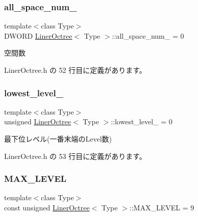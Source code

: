\subsubsection{\texorpdfstring{all\+\_\+space\+\_\+num\+\_\+}{all\_space\_num\_}}
{\footnotesize\ttfamily template$<$class Type$>$ \\
D\+W\+O\+RD \mbox{\hyperlink{class_liner_octree}{Liner\+Octree}}$<$ Type $>$\+::all\+\_\+space\+\_\+num\+\_\+ = 0\hspace{0.3cm}{\ttfamily [private]}}



空間数 



 Liner\+Octree.\+h の 52 行目に定義があります。

\mbox{\label{class_liner_octree_aa62a6ad34ceed4a8fef93123ca45350d}} 
\subsubsection{\texorpdfstring{lowest\+\_\+level\+\_\+}{lowest\_level\_}}
{\footnotesize\ttfamily template$<$class Type$>$ \\
unsigned \mbox{\hyperlink{class_liner_octree}{Liner\+Octree}}$<$ Type $>$\+::lowest\+\_\+level\+\_\+ = 0\hspace{0.3cm}{\ttfamily [private]}}



最下位レベル(一番末端の\+Level数) 



 Liner\+Octree.\+h の 53 行目に定義があります。

\mbox{\label{class_liner_octree_aced865f2822181486eb805e4db1f0a32}} 
\subsubsection{\texorpdfstring{M\+A\+X\+\_\+\+L\+E\+V\+EL}{MAX\_LEVEL}}
{\footnotesize\ttfamily template$<$class Type$>$ \\
const unsigned \mbox{\hyperlink{class_liner_octree}{Liner\+Octree}}$<$ Type $>$\+::M\+A\+X\+\_\+\+L\+E\+V\+EL = 9\hspace{0.3cm}{\ttfamily [static]}}



